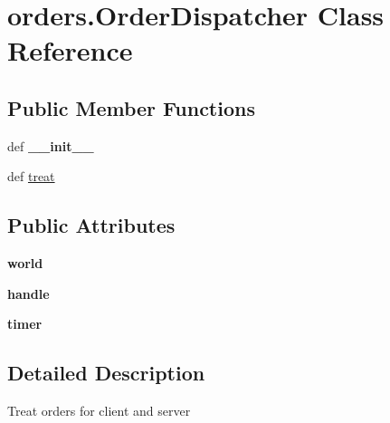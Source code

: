 \hypertarget{classorders_1_1_order_dispatcher}{\section{orders.\-Order\-Dispatcher \-Class \-Reference}
\label{classorders_1_1_order_dispatcher}
}
\subsection*{\-Public \-Member \-Functions}
\begin{DoxyCompactItemize}
\item 
\hypertarget{classorders_1_1_order_dispatcher_ae49ccd75a98bf4d03734acabc60a8191}{def {\bfseries \-\_\-\-\_\-init\-\_\-\-\_\-}}\label{classorders_1_1_order_dispatcher_ae49ccd75a98bf4d03734acabc60a8191}

\item 
def \hyperlink{classorders_1_1_order_dispatcher_ad7ce3b5e93f23334280236d7b3f65c01}{treat}
\end{DoxyCompactItemize}
\subsection*{\-Public \-Attributes}
\begin{DoxyCompactItemize}
\item 
\hypertarget{classorders_1_1_order_dispatcher_a3e8a2d43b1b5849af6d2556d6bca5b18}{{\bfseries world}}\label{classorders_1_1_order_dispatcher_a3e8a2d43b1b5849af6d2556d6bca5b18}

\item 
\hypertarget{classorders_1_1_order_dispatcher_a46638f289946e25105aa54056c792324}{{\bfseries handle}}\label{classorders_1_1_order_dispatcher_a46638f289946e25105aa54056c792324}

\item 
\hypertarget{classorders_1_1_order_dispatcher_a753b3b377c0103eb3130eca0e792e75d}{{\bfseries timer}}\label{classorders_1_1_order_dispatcher_a753b3b377c0103eb3130eca0e792e75d}

\end{DoxyCompactItemize}


\subsection{\-Detailed \-Description}
\begin{DoxyVerb}Treat orders for client and server \end{DoxyVerb}
 

